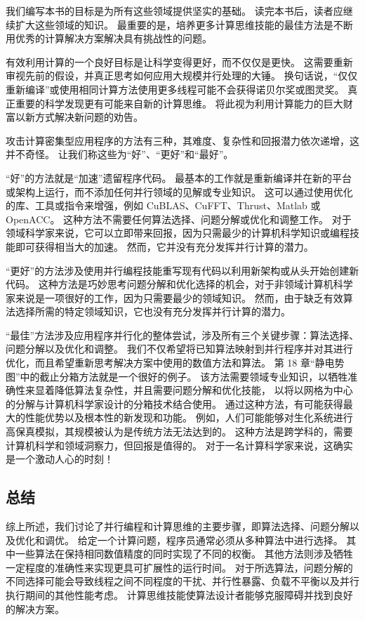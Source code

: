 我们编写本书的目标是为所有这些领域提供坚实的基础。 读完本书后，读者应继续扩大这些领域的知识。 
最重要的是，培养更多计算思维技能的最佳方法是不断用优秀的计算解决方案解决具有挑战性的问题。

有效利用计算的一个良好目标是让科学变得更好，而不仅仅是更快。 
这需要重新审视先前的假设，并真正思考如何应用大规模并行处理的大锤。 
换句话说，“仅仅重新编译”或使用相同计算方法使用更多线程可能不会获得诺贝尔奖或图灵奖。
 真正重要的科学发现更有可能来自新的计算思维。 将此视为利用计算能力的巨大财富以新方式解决新问题的劝告。

攻击计算密集型应用程序的方法有三种，其难度、复杂性和回报潜力依次递增，这并不奇怪。 
让我们称这些为“好”、“更好”和“最好”。

“好”的方法就是“加速”遗留程序代码。 
最基本的工作就是重新编译并在新的平台或架构上运行，而不添加任何并行领域的见解或专业知识。 
这可以通过使用优化的库、工具或指令来增强，例如 CuBLAS、CuFFT、Thrust、Matlab 或 OpenACC。 
这种方法不需要任何算法选择、问题分解或优化和调整工作。 
对于领域科学家来说，它可以立即带来回报，因为只需最少的计算机科学知识或编程技能即可获得相当大的加速。 
然而，它并没有充分发挥并行计算的潜力。

“更好”的方法涉及使用并行编程技能重写现有代码以利用新架构或从头开始创建新代码。 
这种方法是巧妙思考问题分解和优化选择的机会，对于非领域计算机科学家来说是一项很好的工作，因为只需要最少的领域知识。 
然而，由于缺乏有效算法选择所需的特定领域知识，它也没有充分发挥并行计算的潜力。

“最佳”方法涉及应用程序并行化的整体尝试，涉及所有三个关键步骤：算法选择、问题分解以及优化和调整。 
我们不仅希望将已知算法映射到并行程序并对其进行优化，而且希望重新思考解决方案中使用的数值方法和算法。 
第 18 章“静电势图”中的截止分箱方法就是一个很好的例子。 
该方法需要领域专业知识，以牺牲准确性来显着降低算法复杂性，并且需要问题分解和优化技能，
以将以网格为中心的分解与计算机科学家设计的分箱技术结合使用。 
通过这种方法，有可能获得最大的性能优势以及根本性的新发现和功能。 
例如，人们可能能够对生化系统进行高保真模拟，其规模被认为是传统方法无法达到的。 
这种方法是跨学科的，需要计算机科学和领域洞察力，但回报是值得的。 对于一名计算科学家来说，这确实是一个激动人心的时刻！

\subsection{总结}
综上所述，我们讨论了并行编程和计算思维的主要步骤，即算法选择、问题分解以及优化和调优。 
给定一个计算问题，程序员通常必须从多种算法中进行选择。 其中一些算法在保持相同数值精度的同时实现了不同的权衡。 
其他方法则涉及牺牲一定程度的准确性来实现更具可扩展性的运行时间。 
对于所选算法，问题分解的不同选择可能会导致线程之间不同程度的干扰、并行性暴露、负载不平衡以及并行执行期间的其他性能考虑。 
计算思维技能使算法设计者能够克服障碍并找到良好的解决方案。